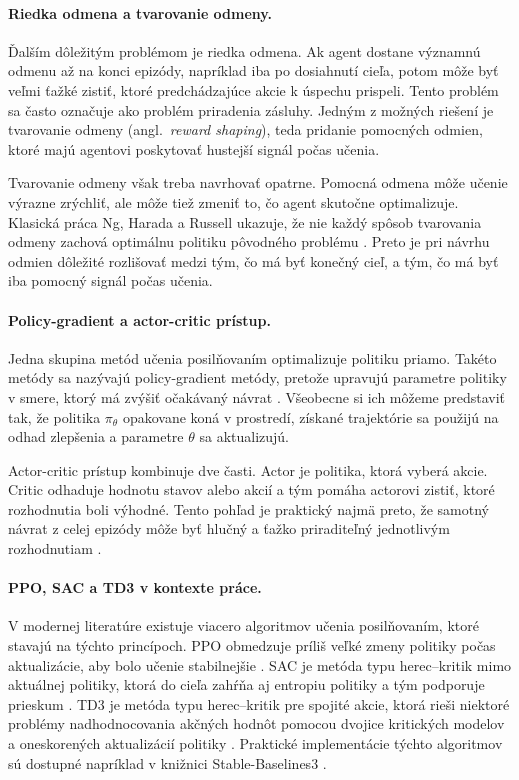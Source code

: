 \paragraph{Riedka odmena a tvarovanie odmeny.}
Ďalším dôležitým problémom je riedka odmena. Ak agent dostane významnú odmenu až na konci epizódy, napríklad iba po dosiahnutí cieľa, potom môže byť veľmi ťažké zistiť, ktoré predchádzajúce akcie k úspechu prispeli. Tento problém sa často označuje ako problém priradenia zásluhy. Jedným z možných riešení je tvarovanie odmeny (angl.~\emph{reward shaping}), teda pridanie pomocných odmien, ktoré majú agentovi poskytovať hustejší signál počas učenia.

Tvarovanie odmeny však treba navrhovať opatrne. Pomocná odmena môže učenie výrazne zrýchliť, ale môže tiež zmeniť to, čo agent skutočne optimalizuje. Klasická práca Ng, Harada a Russell ukazuje, že nie každý spôsob tvarovania odmeny zachová optimálnu politiku pôvodného problému \cite{ng1999shaping}. Preto je pri návrhu odmien dôležité rozlišovať medzi tým, čo má byť konečný cieľ, a tým, čo má byť iba pomocný signál počas učenia.

\paragraph{Policy-gradient a actor-critic prístup.}
Jedna skupina metód učenia posilňovaním optimalizuje politiku priamo. Takéto metódy sa nazývajú policy-gradient metódy, pretože upravujú parametre politiky v smere, ktorý má zvýšiť očakávaný návrat \cite{sutton_barto2018rl}. Všeobecne si ich môžeme predstaviť tak, že politika $\pi_\theta$ opakovane koná v prostredí, získané trajektórie sa použijú na odhad zlepšenia a parametre $\theta$ sa aktualizujú.

Actor-critic prístup kombinuje dve časti. Actor je politika, ktorá vyberá akcie. Critic odhaduje hodnotu stavov alebo akcií a tým pomáha actorovi zistiť, ktoré rozhodnutia boli výhodné. Tento pohľad je praktický najmä preto, že samotný návrat z celej epizódy môže byť hlučný a ťažko priraditeľný jednotlivým rozhodnutiam \cite{sutton_barto2018rl}.

\paragraph{PPO, SAC a TD3 v kontexte práce.}
V modernej literatúre existuje viacero algoritmov učenia posilňovaním, ktoré stavajú na týchto princípoch. PPO obmedzuje príliš veľké zmeny politiky počas aktualizácie, aby bolo učenie stabilnejšie \cite{schulman2017ppo}. SAC je metóda typu herec--kritik mimo aktuálnej politiky, ktorá do cieľa zahŕňa aj entropiu politiky a tým podporuje prieskum \cite{haarnoja2018sac}. TD3 je metóda typu herec--kritik pre spojité akcie, ktorá rieši niektoré problémy nadhodnocovania akčných hodnôt pomocou dvojice kritických modelov a oneskorených aktualizácií politiky \cite{fujimoto2018td3}. Praktické implementácie týchto algoritmov sú dostupné napríklad v knižnici Stable-Baselines3 \cite{raffin2021sb3}.

